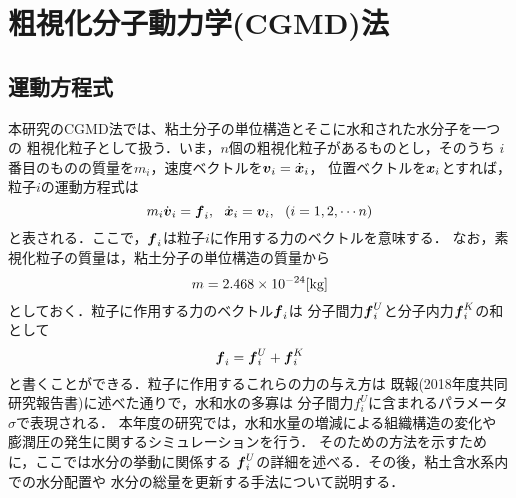 ﻿%
\section{粗視化分子動力学(CGMD)法}
\subsection{運動方程式}
本研究のCGMD法では、粘土分子の単位構造とそこに水和された水分子を一つの
粗視化粒子として扱う．いま，$n$個の粗視化粒子があるものとし，そのうち
$i$番目のものの質量を$m_i$，速度ベクトルを$\mbox{\boldmath $v$}_i=\dot{\mbox{\boldmath $x$}}_i$，
位置ベクトルを$\mbox{\boldmath $x$}_i$とすれば，粒子$i$の運動方程式は
\begin{equation}
	m_i \dot {\fat{v}}_i =\fat{f}_i ,\ \ 
	\dot{\fat{x}}_i = \fat{v}_i, \ \ ( i =1,2,\cdots n )
	\label{eqn:eq_mot}
\end{equation}
と表される．ここで，$\mbox{\boldmath $f$}_i$は粒子$i$に作用する力のベクトルを意味する．
なお，素視化粒子の質量は，粘土分子の単位構造の質量から
\begin{equation}
	m=2.468\times 10 ^{-24}[{\rm kg}]
	\label{eqn:mass}
\end{equation}
としておく．粒子に作用する力のベクトル$\mbox{\boldmath $f$}_i$は
分子間力$\mbox{\boldmath $f$}_i^{U}$と分子内力$\mbox{\boldmath $f$}_i^{K}$の和として
\begin{equation}
	\mbox{\boldmath $f$}_i=\mbox{\boldmath $f$}_i^U+\mbox{\boldmath $f$}_i^K
	\label{eqn:f_tot}
\end{equation}
と書くことができる．粒子に作用するこれらの力の与え方は
既報(2018年度共同研究報告書)に述べた通りで，水和水の多寡は
分子間力$f_i^U$に含まれるパラメータ$\sigma$で表現される．
本年度の研究では，水和水量の増減による組織構造の変化や
膨潤圧の発生に関するシミュレーションを行う．
そのための方法を示すために，ここでは水分の挙動に関係する
$\mbox{\boldmath $f$}_i^U$の詳細を述べる．その後，粘土含水系内での水分配置や
水分の総量を更新する手法について説明する．\\

